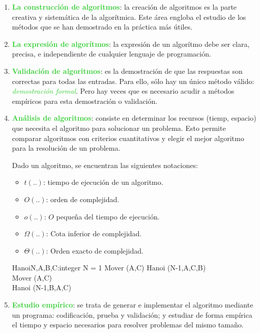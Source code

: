 \documentclass[10pt,a4paper,spanish]{report}
\theoremstyle{definition}
\theoremstyle{remark}
\begin{document}
    \begin{enumerate}[$ \clubsuit $]
        \item \textbf{\textcolor{LimeGreen}{La construcción de algoritmos}}: la creación de algoritmos es la parte creativa y sistemática de la algorítmica. Este área engloba el estudio de los métodos que se han demostrado en la práctica más útiles.

        \item \textbf{\textcolor{LimeGreen}{La expresión de algorítmos}}: la expresión de un algorítmo debe ser clara, precisa, e independiente de cualquier lenguaje de programación.

        \item \textbf{\textcolor{LimeGreen}{Validación de algoritmos}}: es la demostración de que las respuestas son correctas para todas las entradas. Para ello, sólo hay un único método válido: \textit{\textcolor{LimeGreen}{demostración formal}}. Pero hay veces que es necesario acudir a métodos empíricos para esta demostración o validación.

        \item \textbf{\textcolor{LimeGreen}{Análisis de algoritmos}}: consiste en determinar los recursos (tiemp, espacio) que necesita el algoritmo para solucionar un problema. Esto permite comparar algoritmos con criterios cuantitativos y elegir el mejor algoritmo para la resolución de un problema.

        Dado un algoritmo, se encuentran las siguientes notaciones:

        \begin{itemize}
            \item $t(..)$: tiempo de ejecución de un algoritmo.
            \item $O(..)$: orden de complejidad.
            \item $o(..)$: $O$ pequeña del tiempo de ejecución.
            \item $\Omega(..)$: Cota inferior de complejidad.
            \item $\Theta(..)$: Orden exacto de complejidad.
        \end{itemize}

        \begin{pseudocode}{Hanoi}{N,A,B,C:integer}
            \IF N = 1 \THEN
                Mover (A,C)
            \ELSE
                \BEGIN
                    Hanoi (N-1,A,C,B)\\
                    Mover (A,C)\\
                    Hanoi (N-1,B,A,C)
                \END
        \end{pseudocode}

        \item \textbf{\textcolor{LimeGreen}{Estudio empírico}}: se trata de generar e implementar el algoritmo mediante un programa: codificación, prueba y validación; y estudiar de forma empírica el tiempo y espacio necesarios para resolver problemas del mismo tamaño.
        
    \end{enumerate}
\end{document}
